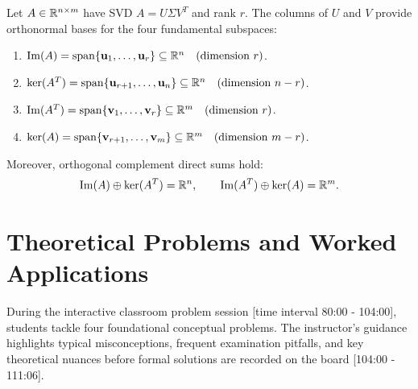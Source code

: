 \begin{theorem}
\label{thm:subspaces-svd-general-en}
Let $A \in \mathbb{R}^{n \times m}$ have SVD $A = U \Sigma V^T$ and rank $r$. The columns of $U$ and $V$ provide orthonormal bases for the four fundamental subspaces:
\begin{enumerate}
    \item $\operatorname{Im}(A) = \operatorname{span}\{\mathbf{u}_1, \dots, \mathbf{u}_r\} \subseteq \mathbb{R}^n \quad (\text{dimension } r)$.
    \item $\ker(A^T) = \operatorname{span}\{\mathbf{u}_{r+1}, \dots, \mathbf{u}_n\} \subseteq \mathbb{R}^n \quad (\text{dimension } n - r)$.
    \item $\operatorname{Im}(A^T) = \operatorname{span}\{\mathbf{v}_1, \dots, \mathbf{v}_r\} \subseteq \mathbb{R}^m \quad (\text{dimension } r)$.
    \item $\ker(A) = \operatorname{span}\{\mathbf{v}_{r+1}, \dots, \mathbf{v}_m\} \subseteq \mathbb{R}^m \quad (\text{dimension } m - r)$.
\end{enumerate}
Moreover, orthogonal complement direct sums hold:
\begin{equation}
    \operatorname{Im}(A) \oplus \ker(A^T) = \mathbb{R}^n, \qquad \operatorname{Im}(A^T) \oplus \ker(A) = \mathbb{R}^m.
\end{equation}
\end{theorem}

\FloatBarrier
\section{Theoretical Problems and Worked Applications}
\label{sec:svd-problems-applications-en}

During the interactive classroom problem session [time interval 80:00 - 104:00], students tackle four foundational conceptual problems. The instructor's guidance highlights typical misconceptions, frequent examination pitfalls, and key theoretical nuances before formal solutions are recorded on the board [104:00 - 111:06].

